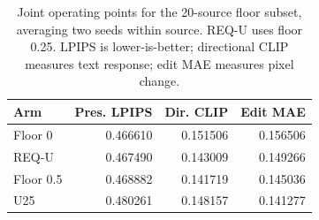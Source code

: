 \begin{table}[!t]
\centering\small
\caption{Joint operating points for the 20-source floor subset, averaging two seeds within source. REQ-U uses floor 0.25. LPIPS is lower-is-better; directional CLIP measures text response; edit MAE measures pixel change.}
\label{tab:r91-floor-points}
\begin{tabular}{lrrr}
\toprule
Arm & Pres. LPIPS & Dir. CLIP & Edit MAE\\
\midrule
Floor 0 & 0.466610 & 0.151506 & 0.156506\\
REQ-U & 0.467490 & 0.143009 & 0.149266\\
Floor 0.5 & 0.468882 & 0.141719 & 0.145036\\
U25 & 0.480261 & 0.148157 & 0.141277\\
\bottomrule
\end{tabular}
\end{table}
